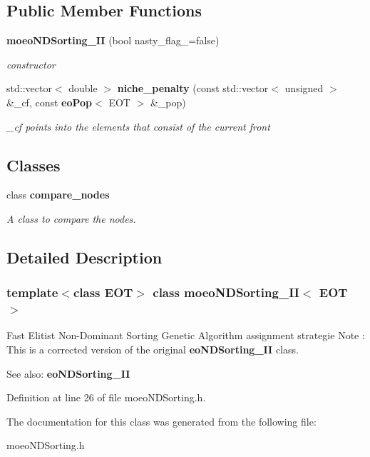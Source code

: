 \subsection*{Public Member Functions}
\begin{CompactItemize}
\item 
{\bf moeo\-NDSorting\_\-II} (bool nasty\_\-flag\_\-=false)\label{classmoeoNDSorting__II_820e9987853858ddc59e36c7f267955e}

\begin{CompactList}\small\item\em constructor \item\end{CompactList}\item 
std::vector$<$ double $>$ {\bf niche\_\-penalty} (const std::vector$<$ unsigned $>$ \&\_\-cf, const {\bf eo\-Pop}$<$ EOT $>$ \&\_\-pop)\label{classmoeoNDSorting__II_265c74b9f64731db86e2c363593f67f9}

\begin{CompactList}\small\item\em \_\-cf points into the elements that consist of the current front \item\end{CompactList}\end{CompactItemize}
\subsection*{Classes}
\begin{CompactItemize}
\item 
class {\bf compare\_\-nodes}
\begin{CompactList}\small\item\em A class to compare the nodes. \item\end{CompactList}\end{CompactItemize}


\subsection{Detailed Description}
\subsubsection*{template$<$class EOT$>$ class moeo\-NDSorting\_\-II$<$ EOT $>$}

Fast Elitist Non-Dominant Sorting Genetic Algorithm assignment strategie Note : This is a corrected version of the original {\bf eo\-NDSorting\_\-II} class. 

\begin{Desc}
\item[See also:]{\bf eo\-NDSorting\_\-II} \end{Desc}




Definition at line 26 of file moeo\-NDSorting.h.

The documentation for this class was generated from the following file:\begin{CompactItemize}
\item 
moeo\-NDSorting.h\end{CompactItemize}
